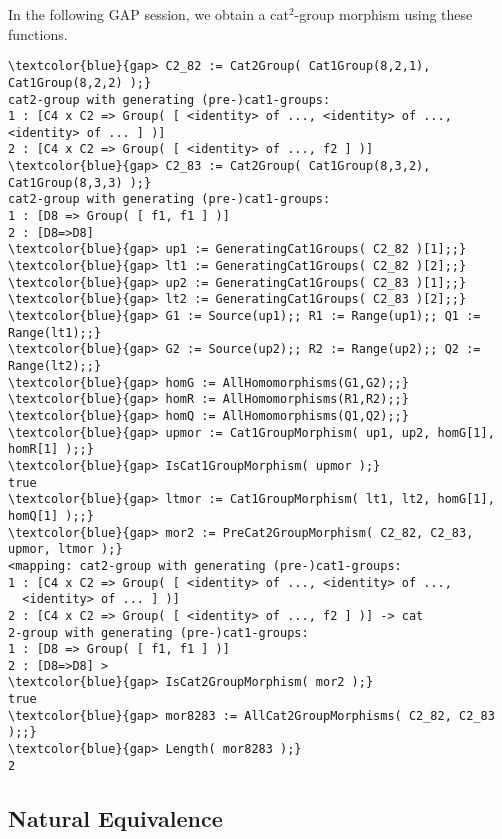 \documentclass[a4paper,11pt]{article}
\theoremstyle{plain}
\theoremstyle{definition}
\begin{document}
In the following \textsf{GAP} session, we obtain a cat$^{2}$-group morphism
using these functions.

\begin{Verbatim}[frame=single, fontsize=\small, commandchars=\\\{\}]
\textcolor{blue}{gap> C2_82 := Cat2Group( Cat1Group(8,2,1), Cat1Group(8,2,2) );}
cat2-group with generating (pre-)cat1-groups:
1 : [C4 x C2 => Group( [ <identity> of ..., <identity> of ...,
<identity> of ... ] )]
2 : [C4 x C2 => Group( [ <identity> of ..., f2 ] )]
\textcolor{blue}{gap> C2_83 := Cat2Group( Cat1Group(8,3,2), Cat1Group(8,3,3) );}
cat2-group with generating (pre-)cat1-groups:
1 : [D8 => Group( [ f1, f1 ] )]
2 : [D8=>D8]
\textcolor{blue}{gap> up1 := GeneratingCat1Groups( C2_82 )[1];;}
\textcolor{blue}{gap> lt1 := GeneratingCat1Groups( C2_82 )[2];;}
\textcolor{blue}{gap> up2 := GeneratingCat1Groups( C2_83 )[1];;}
\textcolor{blue}{gap> lt2 := GeneratingCat1Groups( C2_83 )[2];;}
\textcolor{blue}{gap> G1 := Source(up1);; R1 := Range(up1);; Q1 := Range(lt1);;}
\textcolor{blue}{gap> G2 := Source(up2);; R2 := Range(up2);; Q2 := Range(lt2);;}
\textcolor{blue}{gap> homG := AllHomomorphisms(G1,G2);;}
\textcolor{blue}{gap> homR := AllHomomorphisms(R1,R2);;}
\textcolor{blue}{gap> homQ := AllHomomorphisms(Q1,Q2);;}
\textcolor{blue}{gap> upmor := Cat1GroupMorphism( up1, up2, homG[1], homR[1] );;}
\textcolor{blue}{gap> IsCat1GroupMorphism( upmor );}
true
\textcolor{blue}{gap> ltmor := Cat1GroupMorphism( lt1, lt2, homG[1], homQ[1] );;}
\textcolor{blue}{gap> mor2 := PreCat2GroupMorphism( C2_82, C2_83, upmor, ltmor );}
<mapping: cat2-group with generating (pre-)cat1-groups:
1 : [C4 x C2 => Group( [ <identity> of ..., <identity> of ..., 
  <identity> of ... ] )]
2 : [C4 x C2 => Group( [ <identity> of ..., f2 ] )] -> cat
2-group with generating (pre-)cat1-groups:
1 : [D8 => Group( [ f1, f1 ] )]
2 : [D8=>D8] >
\textcolor{blue}{gap> IsCat2GroupMorphism( mor2 );}
true
\textcolor{blue}{gap> mor8283 := AllCat2GroupMorphisms( C2_82, C2_83 );;}
\textcolor{blue}{gap> Length( mor8283 );}
2
\end{Verbatim}



\subsection{Natural Equivalence}
\end{document}
